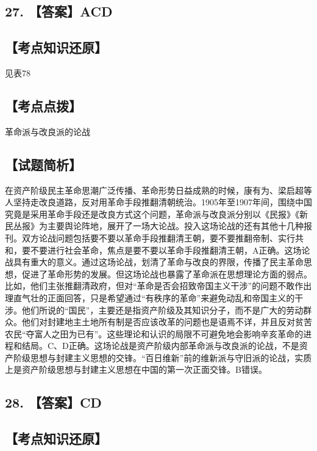 \documentclass[UTF8,11pt]{ctexart}
\begin{document}
\subsection*{27. 【答案】ACD}

\subsection*{【考点知识还原】}

见表78


\subsection*{【考点点拨】}

革命派与改良派的论战


\subsection*{【试题简析】}

在资产阶级民主革命思潮广泛传播、革命形势日益成熟的时候，康有为、梁启超等人坚持走改良道路，反对用革命手段推翻清朝统治。1905年至1907年间，围绕中国究竟是采用革命手段还是改良方式这个问题，革命派与改良派分别以《民报》《新民丛报》为主要舆论阵地，展开了一场大论战。投入这场论战的还有其他十几种报刊。双方论战问题包括要不要以革命手段推翻清王朝，要不要推翻帝制、实行共和，要不要进行社会革命，焦点是要不要以革命手段推翻清王朝，A正确。这场论战具有重大的意义。通过这场论战，划清了革命与改良的界限，传播了民主革命思想，促进了革命形势的发展。但这场论战也暴露了革命派在思想理论方面的弱点。比如，他们主张推翻清政府，但对“革命是否会招致帝国主义干涉”的问题不敢作出理直气壮的正面回答，只是希望通过“有秩序的革命”来避免动乱和帝国主义的干涉。他们所说的“国民”，主要还是指资产阶级及其知识分子，而不是广大的劳动群众。他们对封建地主土地所有制是否应该改革的问题也是语焉不详，并且反对贫苦农民“夺富人之田为已有”。这些理论和认识的局限不可避免地会影响辛亥革命的进程和结局。C、D正确。这场论战是资产阶级内部革命派与改良派的论战，不是资产阶级思想与封建主义思想的交锋。“百日维新”前的维新派与守旧派的论战，实质上是资产阶级思想与封建主义思想在中国的第一次正面交锋。B错误。


\subsection*{28. 【答案】CD}

\subsection*{【考点知识还原】}
\end{document}
